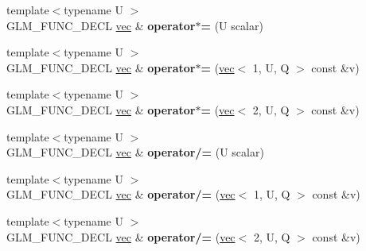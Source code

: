 \begin{DoxyCompactItemize}
{\footnotesize template$<$typename U $>$ }\\G\+L\+M\+\_\+\+F\+U\+N\+C\+\_\+\+D\+E\+CL \hyperlink{structglm_1_1vec}{vec} \& {\bfseries operator$\ast$=} (U scalar)
\item 
\mbox{\label{structglm_1_1vec_3_012_00_01T_00_01Q_01_4_acf5a22f65506ef65ad1183416e0ea077}} 
{\footnotesize template$<$typename U $>$ }\\G\+L\+M\+\_\+\+F\+U\+N\+C\+\_\+\+D\+E\+CL \hyperlink{structglm_1_1vec}{vec} \& {\bfseries operator$\ast$=} (\hyperlink{structglm_1_1vec}{vec}$<$ 1, U, Q $>$ const \&v)
\item 
\mbox{\label{structglm_1_1vec_3_012_00_01T_00_01Q_01_4_ac151d57702d8baed4fa936dc7a39cc15}} 
{\footnotesize template$<$typename U $>$ }\\G\+L\+M\+\_\+\+F\+U\+N\+C\+\_\+\+D\+E\+CL \hyperlink{structglm_1_1vec}{vec} \& {\bfseries operator$\ast$=} (\hyperlink{structglm_1_1vec}{vec}$<$ 2, U, Q $>$ const \&v)
\item 
\mbox{\label{structglm_1_1vec_3_012_00_01T_00_01Q_01_4_aa8482a8ff3984a1cb04caf5e3e684f71}} 
{\footnotesize template$<$typename U $>$ }\\G\+L\+M\+\_\+\+F\+U\+N\+C\+\_\+\+D\+E\+CL \hyperlink{structglm_1_1vec}{vec} \& {\bfseries operator/=} (U scalar)
\item 
\mbox{\label{structglm_1_1vec_3_012_00_01T_00_01Q_01_4_ac08ebb38eeef819015ce62bf46fd1a8f}} 
{\footnotesize template$<$typename U $>$ }\\G\+L\+M\+\_\+\+F\+U\+N\+C\+\_\+\+D\+E\+CL \hyperlink{structglm_1_1vec}{vec} \& {\bfseries operator/=} (\hyperlink{structglm_1_1vec}{vec}$<$ 1, U, Q $>$ const \&v)
\item 
\mbox{\label{structglm_1_1vec_3_012_00_01T_00_01Q_01_4_a5c779bb132a97e91d6d8180a9c3fe31d}} 
{\footnotesize template$<$typename U $>$ }\\G\+L\+M\+\_\+\+F\+U\+N\+C\+\_\+\+D\+E\+CL \hyperlink{structglm_1_1vec}{vec} \& {\bfseries operator/=} (\hyperlink{structglm_1_1vec}{vec}$<$ 2, U, Q $>$ const \&v)
\item 
\mbox{\label{structglm_1_1vec_3_012_00_01T_00_01Q_01_4_a3b86debb295909f1369aebf4b9a834ab}} 

\end{DoxyCompactItemize}
